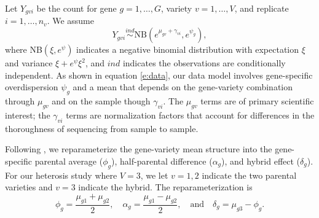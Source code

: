 \documentclass[useAMS,usenatbib,referee]{biom}
\begin{document}
Let $Y_{gvi}$ be the count for gene $g=1,\ldots,G$, variety $v=1,\ldots,V$, and replicate $i=1,\ldots,n_v$.  We assume
\begin{equation} 
Y_{gvi} \stackrel{ind}{\sim} \mbox{NB}\left(e^{\mu_{gv}+\gamma_{vi}},e^{\psi_g}\right), 
\label{e:data}
\end{equation}
where NB$(\xi,e^\psi)$ indicates a negative binomial distribution with expectation $\xi$ and variance $\xi+e^\psi\xi^2$, and $ind$ indicates the observations are conditionally independent.  As shown in equation \eqref{e:data}, our data model involves gene-specific overdispersion $\psi_g$ and a mean that depends on the gene-variety combination through $\mu_{gv}$ and on the sample though  $\gamma_{vi}$.  The $\mu_{gv}$ terms are of primary scientific interest; the $\gamma_{vi}$ terms are normalization factors that account for differences in the thoroughness of sequencing from sample to sample. 

Following \cite{ji2014estimation}, we reparameterize the gene-variety mean structure into the gene-specific parental average ($\phi_g$), half-parental difference ($\alpha_g$), and hybrid effect ($\delta_g$). For our heterosis study where $V=3$, we let $v=1,2$ indicate the two parental varieties and $v=3$ indicate the hybrid. The reparameterization is  
\[ \phi_g = \frac{\mu_{g1}+\mu_{g2}}{2}, \quad 
\alpha_g = \frac{\mu_{g1}-\mu_{g2}}{2}, \quad \mbox{and} \quad
\delta_g = \mu_{g3}-\phi_g. \]
\end{document}
